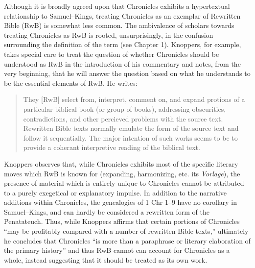 Although it is broadly agreed upon that Chronicles exhibits a
hypertextual\autocite[5]{genette1997} relationship to Samuel--Kings,
treating Chronicles as an exemplar of Rewritten Bible (RwB) is somewhat
less common.\autocites[Though, not particularly
\emph{un}common:][]{campbell_zsengeller2014}{zahn_lim-collins2010}{bernstein_textus2005}[Alexander
considers Chronicles to be a ``prototype'' of RwB,
see][100]{alexander_carson-williamson1988} The ambivalence of scholars
towards treating Chronicles as RwB is rooted, unsurprisingly, in the
confusion surrounding the definition of the term (see Chapter 1).
Knoppers, for example, takes special care to treat the question of
whether Chronicles should be understood as RwB in the introduction of
his commentary and notes, from the very beginning, that he will answer
the question based on what he understands to be the essential elements
of RwB.\autocite[ , 129--134]{knoppers2003} He writes:

\begin{quote}
They {[}RwB{]} select from, interpret, comment on, and expand protions
of a particular biblical book (or group of books), addressing
obscurities, contradictions, and other percieved problems with the
source text. Rewritten Bible texts normally emulate the form of the
source text and follow it sequentially. The major intention of such
works seems to be to provide a coherant interpretive reading of the
biblical text.\autocite[130]{knoppers2003}
\end{quote}

Knoppers observes that, while Chronicles exhibits most of the specific
literary moves which RwB is known for (expanding, harmonizing, etc. its
\emph{Vorlage}), the presence of material which is entirely unique to
Chronicles cannot be attributed to a purely exegetical or explanatory
impulse. In addition to the narrative additions within Chronicles, the
genealogies of 1 Chr 1--9 have no corollary in Samuel--Kings, and can
hardly be considered a rewritten form of the
Penatateuch.\autocite[132]{knoppers2003} Thus, while Knoppers affirms
that certain portions of Chronicles ``may be profitably compared with a
number of rewritten Bible texts,''\autocite[131]{knoppers2003}
ultimately he concludes that Chronicles ``is more than a paraphrase or
literary elaboration of the primary
history''\autocite[134]{knoppers2003} and thus RwB cannot can account
for Chronicles as a whole, instead suggesting that it should be treated
as its own work.\autocite[131--134]{knoppers2003}

